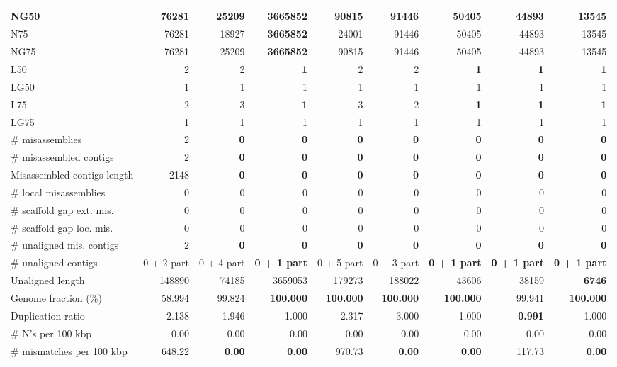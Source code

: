 \documentclass[12pt,a4paper]{article}
\begin{document}
\begin{table}[ht]
\begin{center}
\begin{tabular}{|l*{8}{|r}|}
NG50 & 76281 & 25209 & {\bf 3665852} & 90815 & 91446 & 50405 & 44893 & 13545 \\ \hline
N75 & 76281 & 18927 & {\bf 3665852} & 24001 & 91446 & 50405 & 44893 & 13545 \\ \hline
NG75 & 76281 & 25209 & {\bf 3665852} & 90815 & 91446 & 50405 & 44893 & 13545 \\ \hline
L50 & 2 & 2 & {\bf 1} & 2 & 2 & {\bf 1} & {\bf 1} & {\bf 1} \\ \hline
LG50 & 1 & 1 & 1 & 1 & 1 & 1 & 1 & 1 \\ \hline
L75 & 2 & 3 & {\bf 1} & 3 & 2 & {\bf 1} & {\bf 1} & {\bf 1} \\ \hline
LG75 & 1 & 1 & 1 & 1 & 1 & 1 & 1 & 1 \\ \hline
\# misassemblies & 2 & {\bf 0} & {\bf 0} & {\bf 0} & {\bf 0} & {\bf 0} & {\bf 0} & {\bf 0} \\ \hline
\# misassembled contigs & 2 & {\bf 0} & {\bf 0} & {\bf 0} & {\bf 0} & {\bf 0} & {\bf 0} & {\bf 0} \\ \hline
Misassembled contigs length & 2148 & {\bf 0} & {\bf 0} & {\bf 0} & {\bf 0} & {\bf 0} & {\bf 0} & {\bf 0} \\ \hline
\# local misassemblies & 0 & 0 & 0 & 0 & 0 & 0 & 0 & 0 \\ \hline
\# scaffold gap ext. mis. & 0 & 0 & 0 & 0 & 0 & 0 & 0 & 0 \\ \hline
\# scaffold gap loc. mis. & 0 & 0 & 0 & 0 & 0 & 0 & 0 & 0 \\ \hline
\# unaligned mis. contigs & 2 & {\bf 0} & {\bf 0} & {\bf 0} & {\bf 0} & {\bf 0} & {\bf 0} & {\bf 0} \\ \hline
\# unaligned contigs & 0 + 2 part & 0 + 4 part & {\bf 0 + 1 part} & 0 + 5 part & 0 + 3 part & {\bf 0 + 1 part} & {\bf 0 + 1 part} & {\bf 0 + 1 part} \\ \hline
Unaligned length & 148890 & 74185 & 3659053 & 179273 & 188022 & 43606 & 38159 & {\bf 6746} \\ \hline
Genome fraction (\%) & 58.994 & 99.824 & {\bf 100.000} & {\bf 100.000} & {\bf 100.000} & {\bf 100.000} & 99.941 & {\bf 100.000} \\ \hline
Duplication ratio & 2.138 & 1.946 & 1.000 & 2.317 & 3.000 & 1.000 & {\bf 0.991} & 1.000 \\ \hline
\# N's per 100 kbp & 0.00 & 0.00 & 0.00 & 0.00 & 0.00 & 0.00 & 0.00 & 0.00 \\ \hline
\# mismatches per 100 kbp & 648.22 & {\bf 0.00} & {\bf 0.00} & 970.73 & {\bf 0.00} & {\bf 0.00} & 117.73 & {\bf 0.00} \\ \hline

\end{tabular}
\end{center}
\end{table}
\end{document}
